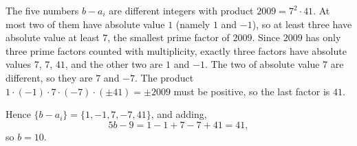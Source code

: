 The five numbers $b-a_i$ are different integers with product $2009=7^2\cdot41$. At most two of them have absolute value $1$ (namely $1$ and $-1$), so at least three have absolute value at least $7$, the smallest prime factor of $2009$. Since $2009$ has only three prime factors counted with multiplicity, exactly three factors have absolute values $7$, $7$, $41$, and the other two are $1$ and $-1$. The two of absolute value $7$ are different, so they are $7$ and $-7$. The product $1\cdot(-1)\cdot7\cdot(-7)\cdot(\pm41)=\pm2009$ must be positive, so the last factor is $41$.

Hence $\{b-a_i\}=\{1,-1,7,-7,41\}$, and adding,
\[
5b-9=1-1+7-7+41=41,
\]
so $b=\boxed{10}$.
